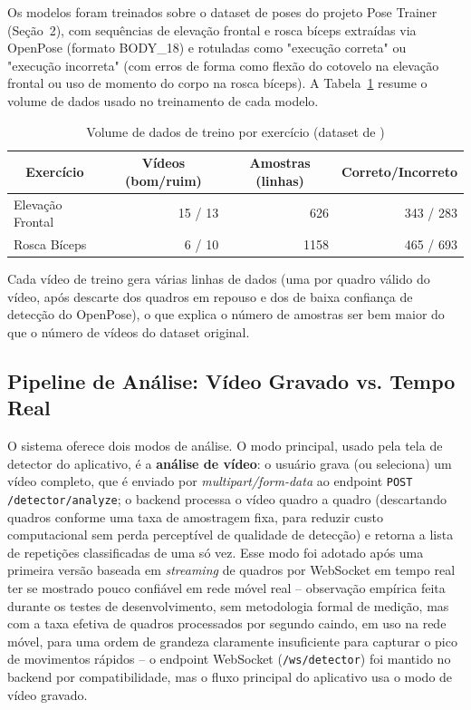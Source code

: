 \documentclass[12pt]{article}
\begin{document}
Os modelos foram treinados sobre o dataset de poses do projeto Pose
Trainer~\cite{chen2020posetrainerrepo} (Seção~2), com sequências de
elevação frontal e rosca bíceps extraídas via OpenPose (formato BODY\_18) e
rotuladas como "execução correta" ou "execução incorreta" (com erros de
forma como flexão do cotovelo na elevação frontal ou uso de momento do
corpo na rosca bíceps). A Tabela~\ref{tab:dataset} resume o volume de
dados usado no treinamento de cada modelo.

\begin{table}[ht]
\centering
\caption{Volume de dados de treino por exercício (dataset de
\cite{chen2020posetrainerrepo})}
\label{tab:dataset}
\begin{tabular}{lrrr}
\hline
\multicolumn{1}{c}{\textbf{Exercício}} & \multicolumn{1}{c}{\textbf{Vídeos (bom/ruim)}} & \multicolumn{1}{c}{\textbf{Amostras (linhas)}} & \multicolumn{1}{c}{\textbf{Correto/Incorreto}} \\
\hline
Elevação Frontal &  15 / 13 &  626 & 343 / 283 \\
Rosca Bíceps      &   6 / 10 & 1158 & 465 / 693 \\
\hline
\end{tabular}
\end{table}

Cada vídeo de treino gera várias linhas de dados (uma por quadro válido do
vídeo, após descarte dos quadros em repouso e dos de baixa confiança de
detecção do OpenPose), o que explica o número de amostras ser bem maior do
que o número de vídeos do dataset original.

\subsection{Pipeline de Análise: Vídeo Gravado vs. Tempo Real}

O sistema oferece dois modos de análise. O modo principal, usado pela
tela de detector do aplicativo, é a \textbf{análise de vídeo}: o usuário
grava (ou seleciona) um vídeo completo, que é enviado por
\textit{multipart/form-data} ao endpoint \texttt{POST /detector/analyze};
o backend processa o vídeo quadro a quadro (descartando quadros conforme
uma taxa de amostragem fixa, para reduzir custo computacional sem perda
perceptível de qualidade de detecção) e retorna a lista de repetições
classificadas de uma só vez. Esse modo foi adotado após uma primeira
versão baseada em \textit{streaming} de quadros por WebSocket em tempo
real ter se mostrado pouco confiável em rede móvel real -- observação
empírica feita durante os testes de desenvolvimento, sem metodologia
formal de medição, mas com a taxa efetiva de quadros processados por
segundo caindo, em uso na rede móvel, para uma ordem de grandeza
claramente insuficiente para capturar o pico de movimentos rápidos -- o
endpoint WebSocket (\texttt{/ws/detector}) foi mantido no
backend por compatibilidade, mas o fluxo principal do aplicativo usa o
modo de vídeo gravado.
\end{document}
